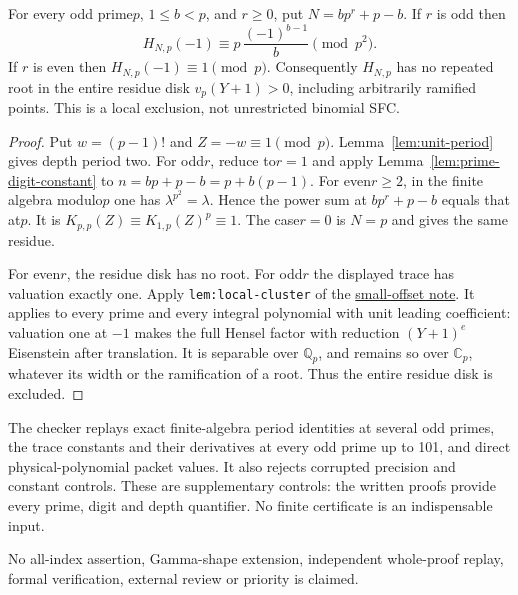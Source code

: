 \documentclass[11pt]{article}
\begin{document}
\begin{theorem}\label{thm:local-packet}
For every odd prime$p$, $1\le b<p$, and $r\ge0$, put
$N=bp^r+p-b$.
If $r$ is odd then
\[
 H_{N,p}(-1)\equiv p\,\frac{(-1)^{b-1}}b\pmod{p^2}.
\]
If $r$ is even then $H_{N,p}(-1)\equiv1\pmod p$.
Consequently $H_{N,p}$ has no repeated root in the entire residue
disk $v_p(Y+1)>0$, including arbitrarily ramified points.
This is a local exclusion, not unrestricted binomial SFC.
\end{theorem}
\begin{proof}
Put $w=(p-1)!$ and $Z=-w\equiv1\pmod p$.
Lemma~\ref{lem:unit-period} gives depth period two.
For odd$r$, reduce to$r=1$ and apply Lemma~\ref{lem:prime-digit-constant} to
$n=bp+p-b=p+b(p-1)$.
For even$r\ge2$, in the finite algebra modulo$p$ one has
$\lambda^{p^2}=\lambda$. Hence the power sum at
$bp^r+p-b$ equals that at$p$.
It is $K_{p,p}(Z)\equiv K_{1,p}(Z)^p\equiv1$.
The case$r=0$ is $N=p$ and gives the same residue.

For even$r$, the residue disk has no root.
For odd$r$ the displayed trace has valuation exactly one.
Apply \texttt{lem:local-cluster} of the
\href{GAP_SIX_SMALL_OFFSET_FAMILIES.tex}{small-offset note}.
It applies to every prime and every integral polynomial with unit
leading coefficient: valuation one at $-1$ makes the full
Hensel factor with reduction $(Y+1)^e$ Eisenstein after translation.
It is separable over $\mathbb Q_p$, and remains so over
$\mathbb C_p$, whatever its width or the ramification of a root.
Thus the entire residue disk is excluded.
\end{proof}
The checker replays exact finite-algebra period identities at several
odd primes, the trace constants and their derivatives at every
odd prime up to 101, and direct physical-polynomial packet values.
It also rejects corrupted precision and constant controls.
These are supplementary controls: the written proofs provide every
prime, digit and depth quantifier. No finite certificate is an
indispensable input.

No all-index assertion, Gamma-shape extension, independent whole-proof
replay, formal verification, external review or priority is claimed.
\end{document}
